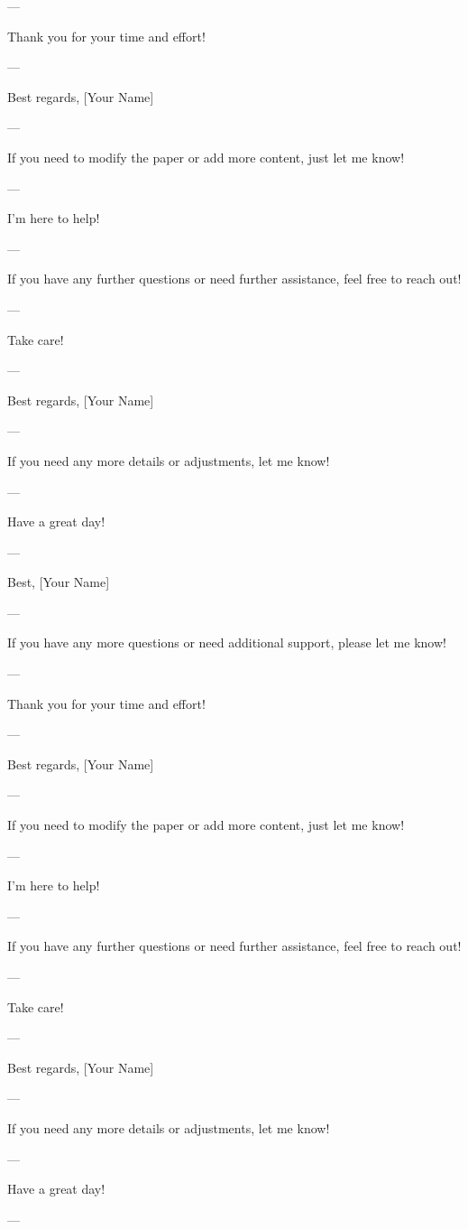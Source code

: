 --- 

Thank you for your time and effort! 

--- 

Best regards,  
[Your Name] 

--- 

If you need to modify the paper or add more content, just let me know! 

--- 

I'm here to help! 

--- 

If you have any further questions or need further assistance, feel free to reach out! 

--- 

Take care! 

--- 

Best regards,  
[Your Name] 

--- 

If you need any more details or adjustments, let me know! 

--- 

Have a great day! 

--- 

Best,  
[Your Name] 

--- 

If you have any more questions or need additional support, please let me know! 

--- 

Thank you for your time and effort! 

--- 

Best regards,  
[Your Name] 

--- 

If you need to modify the paper or add more content, just let me know! 

--- 

I'm here to help! 

--- 

If you have any further questions or need further assistance, feel free to reach out! 

--- 

Take care! 

--- 

Best regards,  
[Your Name] 

--- 

If you need any more details or adjustments, let me know! 

--- 

Have a great day! 

--- 

